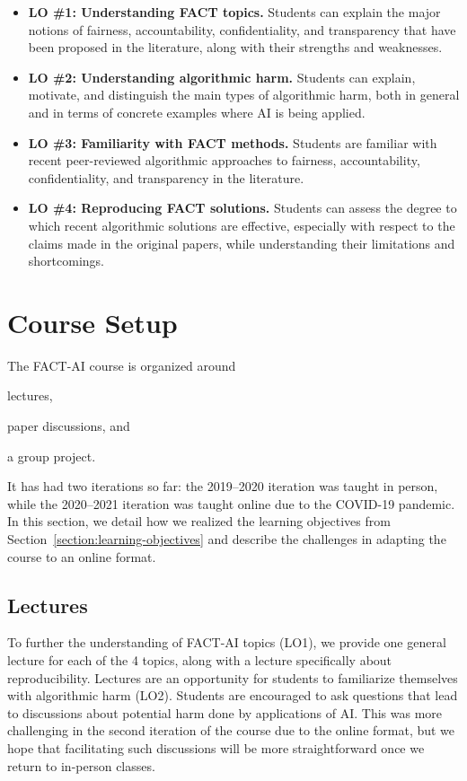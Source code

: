 \documentclass[letterpaper]{article}
\begin{document}
\begin{itemize}
\setlength\itemsep{1em}
	\item \textbf{LO \#1: Understanding FACT topics.} Students can explain the major notions of fairness, accountability, confidentiality, and transparency that have been proposed in the literature, along with their strengths and weaknesses.
	\item \textbf{LO \#2: Understanding algorithmic harm.} Students can explain, motivate, and distinguish the main types of algorithmic harm, both in general and in terms of concrete examples where AI is being applied.
	\item \textbf{LO \#3: Familiarity with FACT methods.} Students are familiar with recent peer-reviewed algorithmic approaches to fairness, accountability, confidentiality, and transparency in the literature.
    \item \textbf{LO \#4: Reproducing FACT solutions.} Students can assess the degree to which recent algorithmic solutions are effective, especially with respect to the claims made in the original papers, while understanding their limitations and shortcomings.
\end{itemize}


\section{Course Setup}
\label{section:coursesetup}
The FACT-AI course is organized around
\begin{enumerate*}[label=(\roman*)]
    \item lectures,
    \item paper discussions, and
    \item a group project.
\end{enumerate*}
It has had two iterations so far: the 2019--2020 iteration was taught in person, while the 2020--2021 iteration was taught online due to the COVID-19 pandemic.
In this section, we detail how we realized the learning objectives from Section~\ref{section:learning-objectives} and describe the challenges in adapting the course to an online format.

\subsection{Lectures}
To further the understanding of FACT-AI topics (LO1), we provide one general lecture for each of the 4 topics, along with a lecture specifically about reproducibility.
Lectures are an opportunity for students to familiarize themselves with algorithmic harm (LO2). Students are encouraged to ask questions that lead to discussions about potential harm done by applications of AI.
This was more challenging in the second iteration of the course due to the online format, but we hope that facilitating such discussions will be more straightforward once we return to in-person classes.
\end{document}
